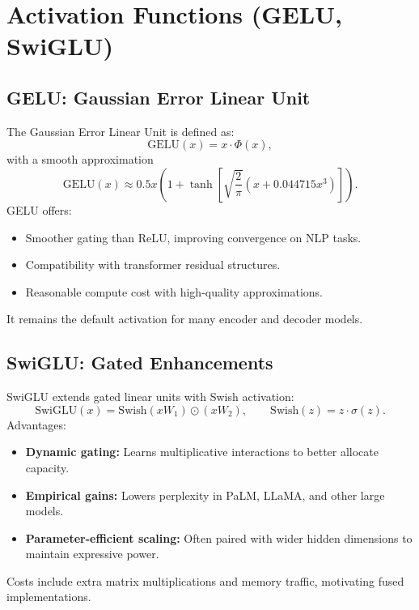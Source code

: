 \documentclass{article}
\begin{document}
\section{Activation Functions (GELU, SwiGLU)}
\subsection{GELU: Gaussian Error Linear Unit}
The Gaussian Error Linear Unit is defined as:
\begin{equation}
  \mathrm{GELU}(x) = x \cdot \Phi(x),
\end{equation}
with a smooth approximation
\begin{equation}
  \mathrm{GELU}(x) \approx 0.5 x \left(1 + \tanh\left[\sqrt{\frac{2}{\pi}} \left(x + 0.044715 x^3\right)\right]\right).
\end{equation}
GELU offers:
\begin{itemize}
  \item Smoother gating than ReLU, improving convergence on NLP tasks.
  \item Compatibility with transformer residual structures.
  \item Reasonable compute cost with high-quality approximations.
\end{itemize}
It remains the default activation for many encoder and decoder models.

\subsection{SwiGLU: Gated Enhancements}
SwiGLU extends gated linear units with Swish activation:
\begin{equation}
  \mathrm{SwiGLU}(x) = \mathrm{Swish}(x W_1) \odot (x W_2), \qquad \mathrm{Swish}(z) = z \cdot \sigma(z).
\end{equation}
Advantages:
\begin{itemize}
  \item \textbf{Dynamic gating:} Learns multiplicative interactions to better allocate capacity.
  \item \textbf{Empirical gains:} Lowers perplexity in PaLM, LLaMA, and other large models.
  \item \textbf{Parameter-efficient scaling:} Often paired with wider hidden dimensions to maintain expressive power.
\end{itemize}
Costs include extra matrix multiplications and memory traffic, motivating fused implementations.
\end{document}
